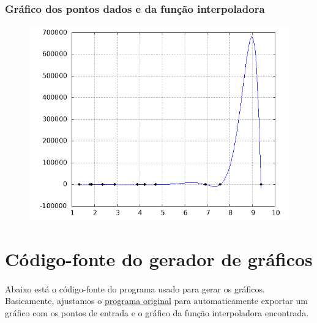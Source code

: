 \documentclass{article}
\begin{document}
                \subsubsection{Gráfico dos pontos dados e da função interpoladora}
                    \begin{figure}[H]
                        \centering
                        \includegraphics[width=0.5\linewidth]{exemplo3.png}
                        \label{fig:placeholder3}
                    \end{figure}

\newpage
\section{Código-fonte do gerador de gráficos}
\paragraph{} Abaixo está o código-fonte do programa usado para gerar os gráficos. Basicamente, ajustamos o \hyperref[sec:codigofonte1]{programa original} para automaticamente exportar um gráfico com os pontos de entrada e o gráfico da função interpoladora encontrada.


\end{document}
